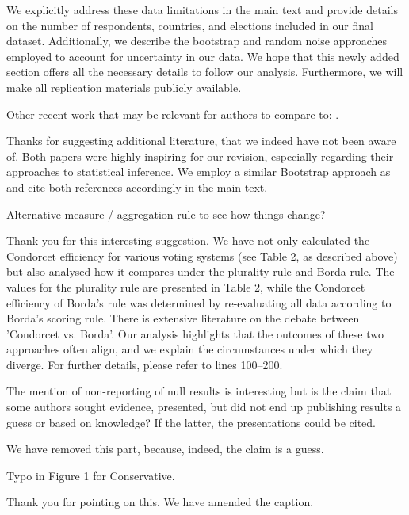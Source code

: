 \documentclass[a4paper, 12pt]{scrartcl}
\theoremstyle{break}
\newenvironment{changes}{\par\color{violet}\par\addvspace{\baselineskip}}{\par\addvspace{\baselineskip}}
\begin{document}
We explicitly address these data limitations in the main text and provide details on the number of respondents, countries, and elections included in our final dataset. Additionally, we describe the bootstrap and random noise approaches employed to account for uncertainty in our data. We hope that this newly added section offers all the necessary details to follow our analysis. Furthermore, we will make all replication materials publicly available.

\begin{changes}
	Other recent work that may be relevant for authors to compare to: \cite{Desai2025, Darmann2019}.
\end{changes}

Thanks for suggesting additional literature, that we indeed have not been aware of. Both papers were highly inspiring for our revision, especially regarding their approaches to statistical inference. We employ a similar Bootstrap approach as \citeauthor{Darmann2019} and cite both references accordingly in the main text. 


\begin{changes}
Alternative measure / aggregation rule to see how things change?
\end{changes}

Thank you for this interesting suggestion. We have not only calculated the Condorcet efficiency for various voting systems (see Table 2, as described above) but also analysed how it compares under the plurality rule and Borda rule. The values for the plurality rule are presented in Table 2, while the Condorcet efficiency of  Borda's rule was determined by re-evaluating all data according to Borda's scoring rule. There is extensive literature on the debate between 'Condorcet vs. Borda'. Our analysis highlights that the outcomes of these two approaches often align, and we explain the circumstances under which they diverge. For further details, please refer to lines 100–200. 

\begin{changes}
	The mention of non-reporting of null results is interesting but is the claim that some authors sought evidence, presented, but did not end up publishing results a guess or based on knowledge? If the latter, the presentations could be cited.
\end{changes}

We have removed this part, because, indeed, the claim is a guess.

\begin{changes}
	Typo in Figure 1 for Conservative.
\end{changes}
Thank you for pointing on this. We have amended the caption. 
\end{document}
